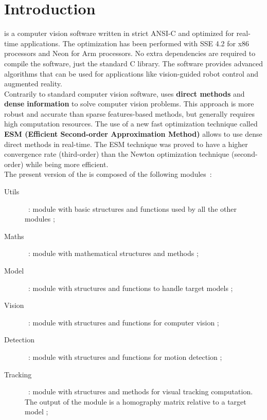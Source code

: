 \chapter{Introduction}
\label{cha:intro}

\rox{} is a computer vision software written in strict ANSI-C
and optimized for real-time applications. The optimization has been performed with SSE 4.2 for x86 processors and Neon for Arm processors.
No extra dependencies are required to compile the software, just the standard C library. The software provides advanced
algorithms that can be used for applications like vision-guided robot
control and augmented reality. \\

Contrarily to standard computer vision software, \rox{} uses {\bf
direct methods} and {\bf dense information} to solve computer vision
problems. This approach is more robust and accurate than sparse
features-based methods, but generally requires high computation
resources. The use of a new fast optimization technique called {\bf
ESM (Efficient Second-order Approximation Method)} allows to use dense
direct methods in real-time. The ESM technique was proved to have a
higher convergence rate (third-order) than the Newton optimization
technique (second-order) while being more efficient.\\

The present version of the \rox{} is composed of the following modules~:

\begin{description}
  \item[Utils]~: module with basic structures and functions used by all the other modules ;
  \item[Maths]~: module with mathematical structures and methods ;
  \item[Model]~: module with structures and functions to handle target models ;
  \item[Vision]~: module with structures and functions for computer vision ;
  \item[Detection]~: module with structures and functions for motion detection ;
  \item[Tracking]~: module with structures and methods for visual tracking computation. The output of the module is a homography matrix relative to a target model ;
\end{description}


%
